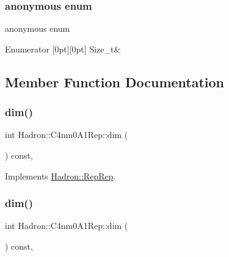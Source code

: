 \subsubsection{\texorpdfstring{anonymous enum}{anonymous enum}}
{\footnotesize\ttfamily anonymous enum}

\begin{DoxyEnumFields}{Enumerator}
[0pt][0pt]{}\mbox{\label{structHadron_1_1C4nm0A1Rep_a0cd1365fcbc6025b208f621691db6844af0a6fc6611b2a642185fb0929bea6b56}} 
Size\+\_\+t&\\
\hline

\end{DoxyEnumFields}


\subsection{Member Function Documentation}
\mbox{\label{structHadron_1_1C4nm0A1Rep_a722d577aa4fe522bb25d0b7577e5dfbb}} 
\subsubsection{\texorpdfstring{dim()}{dim()}\hspace{0.1cm}{\footnotesize\ttfamily [1/5]}}
{\footnotesize\ttfamily int Hadron\+::\+C4nm0\+A1\+Rep\+::dim (\begin{DoxyParamCaption}{ }\end{DoxyParamCaption}) const\hspace{0.3cm}{\ttfamily [inline]}, {\ttfamily [virtual]}}



Implements \mbox{\hyperlink{structHadron_1_1RepRep_a92c8802e5ed7afd7da43ccfd5b7cd92b}{Hadron\+::\+Rep\+Rep}}.

\mbox{\label{structHadron_1_1C4nm0A1Rep_a722d577aa4fe522bb25d0b7577e5dfbb}} 
\subsubsection{\texorpdfstring{dim()}{dim()}\hspace{0.1cm}{\footnotesize\ttfamily [2/5]}}
{\footnotesize\ttfamily int Hadron\+::\+C4nm0\+A1\+Rep\+::dim (\begin{DoxyParamCaption}{ }\end{DoxyParamCaption}) const\hspace{0.3cm}{\ttfamily [inline]}, {\ttfamily [virtual]}}



